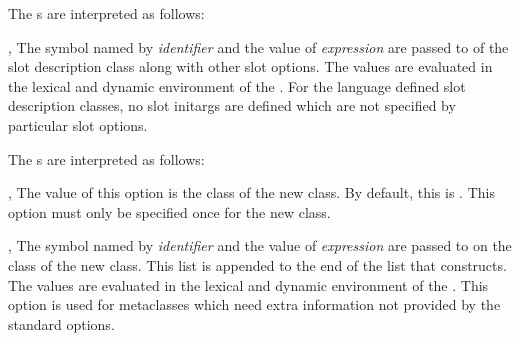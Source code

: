 \begin{optDefinition}
\noindent
The \/s are interpreted as follows:
\begin{options}
    \item[\scref{identifier}, \scref{level-1-form}]%
    The symbol named by {\em identifier} and the value of {\em expression} are
    passed to  of the slot description class along with other
    slot options.  The values are evaluated in the lexical and dynamic
    environment of the .  For the language defined slot
    description classes, no slot initargs are defined which are not specified by
    particular  slot options.
\end{options}
%
The \/s are interpreted as follows:
\begin{options}
    \item[\keyworddef{class}, \scref{class-name}]%
    The value of this option is the class of the new class.  By default, this is
    .  This option must only be specified once for the new
    class.

    \item[\scref{identifier}, \scref{level-1-form}]%
    The symbol named by {\em identifier} and the value of {\em expression} are
    passed to  on the class of the new class.  This list is
    appended to the end of the list that  constructs.  The
    values are evaluated in the lexical and dynamic environment of the
    .  This option is used for metaclasses which need extra
    information not provided by the standard options.
\end{options}
%
\end{optDefinition}


